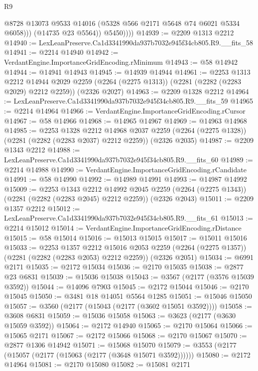\begin{lexlean}{R9}
\begin{coremodule}
                  @8728
                  @13073
                  @9533
                  @14016
                  (@5328 @566 @2171 @5648 @74 @6021 @5334 @6058)))
              (@14735 @23 @5564))
            @5450))))
@14939 := @2209 @1313 @2212
@14940 := LexLeanPreserve.Ca1d3341990da937b7032e945f34cb805.R9.__fits_58
@14941 := @2214 @14940
@14942 := VerdantEngine.ImportanceGridEncoding.rMinimum
@14943 := @58 @14942
@14944 := @14941 @14943
@14945 := @14939 @14944
@14961 := @2253
    @1313
    @2212
    @14944
    @2029
    @2259
    (@2264 (@2275 @1313))
    (@2281 (@2282 (@2283 @2029) @2212 @2259))
    (@2326 @2027)
@14963 := @2209 @1328 @2212
@14964 := LexLeanPreserve.Ca1d3341990da937b7032e945f34cb805.R9.__fits_59
@14965 := @2214 @14964
@14966 := VerdantEngine.ImportanceGridEncoding.rCursor
@14967 := @58 @14966
@14968 := @14965 @14967
@14969 := @14963 @14968
@14985 := @2253
    @1328
    @2212
    @14968
    @2037
    @2259
    (@2264 (@2275 @1328))
    (@2281 (@2282 (@2283 @2037) @2212 @2259))
    (@2326 @2035)
@14987 := @2209 @1343 @2212
@14988 := LexLeanPreserve.Ca1d3341990da937b7032e945f34cb805.R9.__fits_60
@14989 := @2214 @14988
@14990 := VerdantEngine.ImportanceGridEncoding.rCandidate
@14991 := @58 @14990
@14992 := @14989 @14991
@14993 := @14987 @14992
@15009 := @2253
    @1343
    @2212
    @14992
    @2045
    @2259
    (@2264 (@2275 @1343))
    (@2281 (@2282 (@2283 @2045) @2212 @2259))
    (@2326 @2043)
@15011 := @2209 @1357 @2212
@15012 := LexLeanPreserve.Ca1d3341990da937b7032e945f34cb805.R9.__fits_61
@15013 := @2214 @15012
@15014 := VerdantEngine.ImportanceGridEncoding.rDistance
@15015 := @58 @15014
@15016 := @15013 @15015
@15017 := @15011 @15016
@15033 := @2253
    @1357
    @2212
    @15016
    @2053
    @2259
    (@2264 (@2275 @1357))
    (@2281 (@2282 (@2283 @2053) @2212 @2259))
    (@2326 @2051)
@15034 := @6991 @2171
@15035 := @2172 @15034
@15036 := @2170 @15035
@15038 := @2877 @23 @6831
@15039 := @15036 @15038
@15043 := @3567 (@2177 (@3576 @15039 @3592))
@15044 := @14096 @7903
@15045 := @2172 @15044
@15046 := @2170 @15045
@15050 := @3481 @18 @14051 @5564 @1285
@15051 := @15046 @15050
@15057 := @3560 (@2177 (@15043 (@2177 (@3602 @15051 @3592))))
@15058 := @3608 @6831
@15059 := @15036 @15058
@15063 := @3623 (@2177 (@3630 @15059 @3592))
@15064 := @2172 @14940
@15065 := @2170 @15064
@15066 := @15065 @2171
@15067 := @2172 @15066
@15068 := @2170 @15067
@15070 := @2877 @1306 @14942
@15071 := @15068 @15070
@15079 := @3553 (@2177 (@15057 (@2177 (@15063 (@2177 (@3648 @15071 @3592))))))
@15080 := @2172 @14964
@15081 := @2170 @15080
@15082 := @15081 @2171

\end{coremodule}
\end{lexlean}
